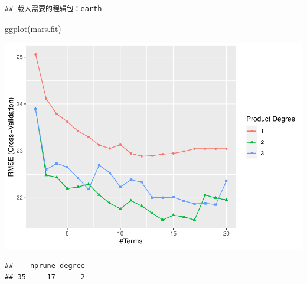 \documentclass[
]{article}
\newenvironment{Shaded}{\begin{snugshade}}{\end{snugshade}}
\newcommand{\FunctionTok}[1]{\textcolor[rgb]{0.00,0.00,0.00}{#1}}
\newcommand{\NormalTok}[1]{#1}
\newcommand{\SpecialCharTok}[1]{\textcolor[rgb]{0.00,0.00,0.00}{#1}}
\begin{document}
\begin{verbatim}
## 载入需要的程辑包：earth
\end{verbatim}

\begin{Shaded}
\begin{Highlighting}[]
\FunctionTok{ggplot}\NormalTok{(mars.fit)}
\end{Highlighting}
\end{Shaded}

\includegraphics{DSII_final_js5095_files/figure-latex/unnamed-chunk-10-1.pdf}

\begin{Shaded}
\end{Shaded}

\begin{verbatim}
##    nprune degree
## 35     17      2
\end{verbatim}

\begin{Shaded}
\end{Shaded}
\end{document}
